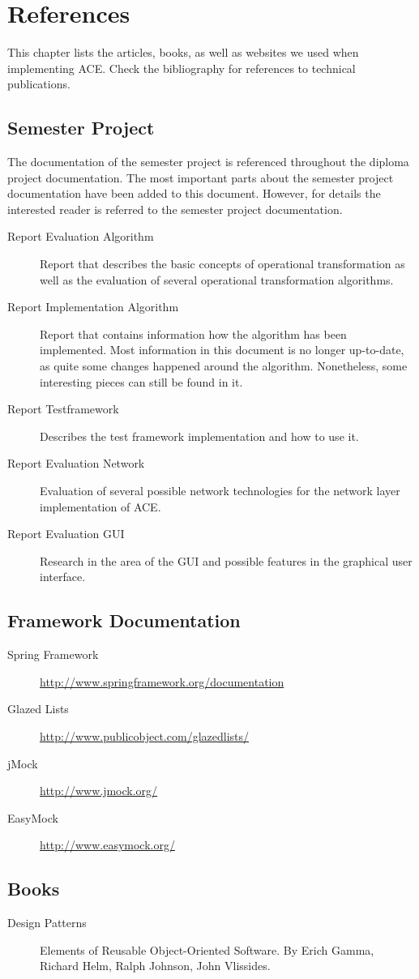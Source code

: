 \chapter{References}
\label{chapter:references}

This chapter lists the articles, books, as well as websites we used when
implementing ACE. Check the bibliography for references to technical
publications.


\section{Semester Project}
The documentation of the semester project is referenced throughout the
diploma project documentation. The most important parts about the 
semester project documentation have been added to this document. However,
for details the interested reader is referred to the semester project
documentation.

\begin{description}
 \item[Report Evaluation Algorithm] Report that describes the basic concepts of operational transformation as well as the evaluation of several operational transformation algorithms.
 \item[Report Implementation Algorithm] Report that contains information how the algorithm has been implemented. Most information in this document is no longer up-to-date, as quite some changes happened around the algorithm. Nonetheless, some interesting pieces can still be found in it.
 \item[Report Testframework] Describes the test framework implementation and how to use it.
 \item[Report Evaluation Network] Evaluation of several possible network technologies for the network layer implementation of ACE.
 \item[Report Evaluation GUI] Research in the area of the GUI and possible features in the graphical user interface.
\end{description}



\section{Framework Documentation}

\begin{description}
 \item[Spring Framework] \href{http://www.springframework.org/documentation}{http://www.springframework.org/documentation}
 \item[Glazed Lists] \href{http://www.publicobject.com/glazedlists/}{http://www.publicobject.com/glazedlists/}
 \item[jMock] \href{http://www.jmock.org/}{http://www.jmock.org/}
 \item[EasyMock] \href{http://www.easymock.org/}{http://www.easymock.org/}
\end{description}

\section{Books}
\begin{description}
 \item[Design Patterns] Elements of Reusable Object-Oriented Software. By Erich Gamma, Richard Helm, Ralph Johnson, John Vlissides.
\end{description}
